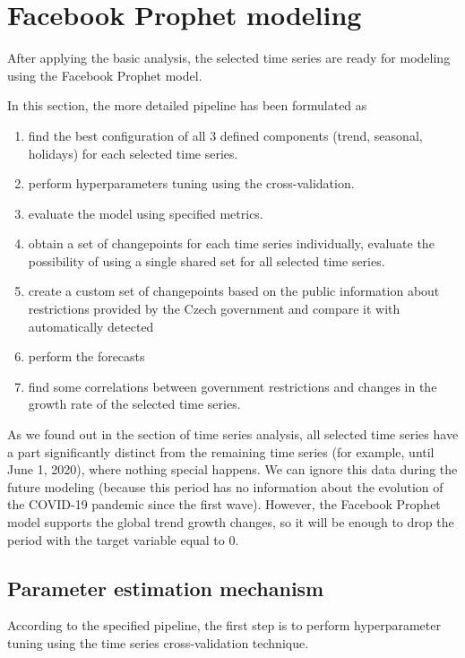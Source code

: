 \hypertarget{s3.3}{\section{Facebook Prophet modeling}}

After applying the basic analysis, the selected time series are ready for modeling using the Facebook Prophet model. 

In this section, the more detailed pipeline has been formulated as
\begin{enumerate}
    \item find the best configuration of all 3 defined components (trend, seasonal, holidays) for each selected time series.
    \item perform hyperparameters tuning using the cross-validation.
    \item evaluate the model using specified metrics.
    \item obtain a set of changepoints for each time series individually, evaluate the possibility of using a single shared set for all selected time series.
    \item create a custom set of changepoints based on the public information about restrictions provided by the Czech government and compare it with automatically detected
    \item perform the forecasts
    \item find some correlations between government restrictions and changes in the growth rate of the selected time series.
\end{enumerate}

As we found out in the section of time series analysis, all selected time series have a part significantly distinct from the remaining time series (for example, until June 1, 2020), where nothing special happens. We can ignore this data during the future modeling (because this period has no information about the evolution of the COVID-19 pandemic since the first wave). However, the Facebook Prophet model supports the global trend growth changes, so it will be enough to drop the period with the target variable equal to 0.

\subsection{Parameter estimation mechanism}

According to the specified pipeline, the first step is to perform hyperparameter tuning using the time series cross-validation technique. 

